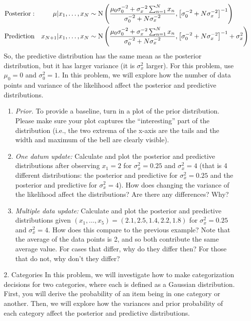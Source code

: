 \documentclass[11pt]{article}
\begin{document}
\begin{enumerate}
\begin{align*}
{\rm Posterior:} & &  \mu & | x_1,\dotsc, x_N \sim {\rm N} \left( \frac{\mu_0 \sigma_0^{-2} + \sigma_x^{-2} \sum_{n=1}^N{x_n}   } {\sigma_0^{-2} + N \sigma_x^{-2} }, \left[ \sigma_0^{-2} + N \sigma_x^{-2} \right]^{-1}  \right)  \\
{\rm Prediction} & & x_{N+1} & | x_1, \dotsc, x_N \sim {\rm N} \left( \frac{ \mu_0 \sigma_0^{-2} + \sigma_x^{-2} \sum_{n=1}^N{x_n}  }{\sigma_0^{-2} + N \sigma_x^{-2} },  \left[ \sigma_0^{-2} + N \sigma_x^{-2} \right]^{-1} + \sigma_x^2 \right)
\end{align*}
So, the predictive distribution has the same mean as the posterior distribution, but it has larger variance (it is $\sigma_x^2$ larger). For this problem, use $\mu_0=0$ and $\sigma_0^2 = 1$.  In this problem, we will explore how the number of data points and variance of the likelihood affect the posterior and predictive distributions.
\begin{enumerate}
\item {\em Prior.} To provide a baseline, turn in a plot of the prior distribution. Please make sure your plot captures the ``interesting'' part of the distribution (i.e., the two extrema of the x-axis are the tails and the width and maximum of the bell are clearly visible). 

\item {\em One datum update:} Calculate and plot the posterior and predictive distributions after observing $x_1=2$ for $\sigma_x^2 = 0.25$ and $\sigma_x^2=4$ (that is 4 different distributions: the posterior and predictive for $\sigma_x^2=0.25$ and the posterior and predictive for $\sigma_x^2=4$). How does changing the variance of the likelihood affect the distributions? Are there any differences? Why?

\item {\em Multiple data update:} Calculate and plot the posterior and predictive distributions given $(x_1,\dotsc, x_5) = (2.1, 2.5, 1.4, 2.2, 1.8)$ for $\sigma_x^2 = 0.25$ and $\sigma_x^2 = 4$. How does this  compare to the previous example? Note that the average of the data points is 2, and so both contribute the same average value. For cases that differ, why do they differ then? For those that do not, why don't they differ?
\end{enumerate}
\item[2. Categories] In this problem, we will investigate how to make categorization decisions for two categories, where each is defined as a Gaussian distribution. First, you will derive the probability of an item being in one category or another. Then, we will explore how the variances and prior probability of each category affect the posterior and predictive distributions. 


\end{enumerate}
\end{document}
